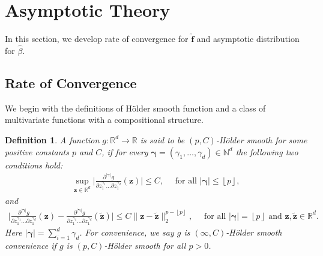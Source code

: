 \documentclass[11pt, preprint]{imsart}
\numberwithin{equation}{section}
\def \bfgamma{\bm{\gamma}}
\def \bfz{\mathbf{z}}
\def \bff{\mathbf{f}}
\def \bff{\mathbf{f}}
\newcommand{\floor}[1]{\left\lfloor #1 \right\rfloor}
\theoremstyle{plain}
\newtheorem{Definition}{Definition}
\theoremstyle{definition}
\begin{document}
\section{Asymptotic Theory}\label{sec:asymptotics}
In this section, we develop rate of convergence for $\widehat{\bff}$ and asymptotic distribution for $\widehat{\beta}$.
\subsection{Rate of Convergence}
We begin with the definitions of H\" older smooth function and a class of multivariate functions with a compositional structure.
\begin{Definition}\label{Definition:p:M:smooth}
A function $g: \mathbb{R}^d \to \mathbb{R}$ is said to be $(p, C)$-H\" older smooth for some positive constants $p$ and $C$, if for every $\bm{\gamma}=(\gamma_1, \ldots, \gamma_d)\in \mathbb{N}^d$ the following two conditions hold:
\begin{eqnarray}
	\sup_{\bfz\in \mathbb{R}^d}\bigg|\frac{\partial^{|\bm{\gamma}|}g}{\partial z_1^{\gamma_1}\ldots \partial z_1^{\gamma_d}}(\bfz)\bigg|\leq C, \quad	 \textrm{ for all  } |\bm{\gamma}|\leq \floor{p},\nonumber
\end{eqnarray}
and
\begin{eqnarray}
	\bigg|\frac{\partial^{|\bm{\gamma}|}g}{\partial z_1^{\gamma_1}\ldots \partial z_1^{\gamma_d}}(\bfz)-\frac{\partial^{|\bm{\gamma}|}g}{\partial z_1^{\gamma_1}\ldots \partial z_1^{\gamma_d}}(\widetilde{\bfz})\bigg|\leq C\|\bfz-\widetilde{\bfz}\|_2^{p-\floor{p}}, \quad	 \textrm{ for all  } |\bm{\gamma}|=\floor{p} \textrm{ and } \bfz,\widetilde{\bfz}\in \mathbb{R}^d.\nonumber
\end{eqnarray}
Here  $|\bfgamma|=\sum_{i=1}^d\gamma_d$.  For convenience, we say $g$ is $(\infty, C)$-H\" older smooth convenience if $g$ is $(p, C)$-H\" older smooth for all $p>0$.  
\end{Definition}
\end{document}
